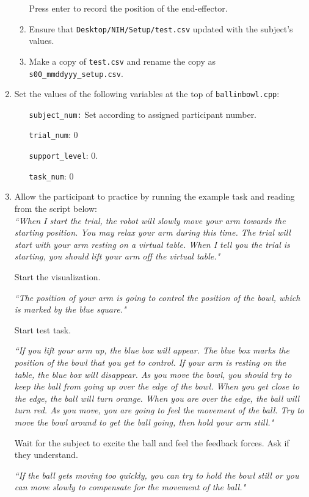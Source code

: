 \documentclass[11pt]{article}
\begin{document}
\begin{enumerate}
\begin{enumerate}
	 Press enter to record the position of the end-effector.
	\item Ensure that \texttt{Desktop/NIH/Setup/test.csv} updated with the subject’s values.
	\item Make a copy of \texttt{test.csv} and rename the copy as \texttt{s00\_mmddyyy\_setup.csv}.
	\end{enumerate}
\item Set the values of the following variables at the top of \texttt{ballinbowl.cpp}:
\begin{enumerate}
\item[\texttt{subject\_num:} ]Set according to assigned participant number.
\item[\texttt{trial\_num}:]$0$
\item[\texttt{support\_level}: ]$0.$
\item[\texttt{task\_num}: ]$0$
\end{enumerate}
\item Allow the participant to practice by running the example task and reading from the script below:\\

\textit{``When I start the trial, the robot will slowly move your arm towards the starting position. You may relax your arm during this time. The trial will start with your arm resting on a virtual table. When I tell you the trial is starting, you should lift your arm off the virtual table."}

Start the visualization.

\textit{``The position of your arm is going to control the position of the bowl, which is marked by the blue square."} 

Start test task.

\textit{``If you lift your arm up, the blue box will appear. The blue box marks the position of the bowl that you get to control. If your arm is resting on the table, the blue box will disappear.
As you move the bowl, you should try to keep the ball from going up over the edge of the bowl. When you get close to the edge, the ball will turn orange. When you are over the edge, the ball will turn red.
As you move, you are going to feel the movement of the ball. 
Try to move the bowl around to get the ball going, then hold your arm still."}

Wait for the subject to excite the ball and feel the feedback forces. Ask if they understand.

\textit{``If the ball gets moving too quickly, you can try to hold the bowl still or you can move slowly to compensate for the movement of the ball."}


\end{enumerate}
\end{document}
